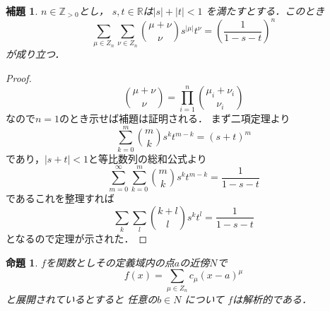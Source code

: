 \documentclass[leqno, a4paper, 12pt]{jsarticle}
\newtheorem{prop}[thm]{命題}
\newtheorem{lem}[thm]{補題}
\newcommand{\zz}{\mathbb{Z}}
\newcommand{\rr}{\mathbb{R}}
\begin{document}
\begin{lem}
$n\in \zz_{>0}$とし，
$s, t\in \rr$は$|s|+|t|<1$
を満たすとする．このとき
\[
\sum_{\mu\in Z_n}\sum_{\nu\in Z_n}\binom{\mu+\nu}{\nu}s^{|\mu|}t^{\nu}
=\left(\frac{1}{1-s-t}\right)^n
\]
が成り立つ．
\end{lem}
\begin{proof}
\[
\binom{\mu+\nu}{\nu}=\prod_{i=1}^n\binom{\mu_i+\nu_i}{\nu_i}
\]
なので$n=1$のとき示せば補題は証明される．
まず二項定理より
\[
\sum_{k=0}^m\binom{m}{k}s^{k}t^{m-k}=(s+t)^{m}
\]
であり，$|s+t|<1$と等比数列の総和公式より
\[
\sum_{m=0}^{\infty}\sum_{k=0}^m\binom{m}{k}s^{k}t^{m-k}=
\frac{1}{1-s-t}
\]
であるこれを整理すれば
\[
\sum_{k}\sum_{l}\binom{k+ l}{l}s^kt^l=\frac{1}{1-s-t}
\]
となるので定理が示された．
\end{proof}

\begin{prop}
$f$を関数としその定義域内の点$a$の近傍$N$で
\[
f(x)=\sum_{\mu\in Z_n}c_{\mu}(x-a)^{\mu}
\]
と展開されているとすると
任意の$b\in N$
について
$f$は解析的である．
\end{prop}
\end{document}
